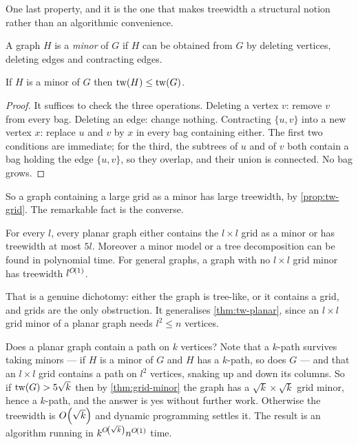 One last property, and it is the one that makes treewidth a structural notion
rather than an algorithmic convenience.

\begin{definition}[Minor]\label{def:minor}
A graph $H$ is a \emph{minor} of $G$ if $H$ can be obtained from $G$ by deleting
vertices, deleting edges and contracting edges.
\end{definition}

\begin{proposition}\label{prop:tw-minor-monotone}
If $H$ is a minor of $G$ then $\mathrm{tw}(H) \le \mathrm{tw}(G)$.
\end{proposition}

\begin{proof}
It suffices to check the three operations. Deleting a vertex $v$: remove $v$
from every bag. Deleting an edge: change nothing. Contracting $\{u,v\}$ into a
new vertex $x$: replace $u$ and $v$ by $x$ in every bag containing either. The
first two conditions are immediate; for the third, the subtrees of $u$ and of
$v$ both contain a bag holding the edge $\{u,v\}$, so they overlap, and their
union is connected. No bag grows.
\end{proof}

So a graph containing a large grid as a minor has large treewidth, by
\cref{prop:tw-grid}. The remarkable fact is the converse.

\begin{theorem}
\label{thm:grid-minor}
For every $l$, every planar graph either contains the $l \times l$ grid as a
minor or has treewidth at most $5l$. Moreover a minor model or a tree
decomposition can be found in polynomial time. For general graphs, a graph with
no $l \times l$ grid minor has treewidth $l^{O\!\left(1\right)}$.
\end{theorem}

That is a genuine dichotomy: either the graph is tree-like, or it contains a
grid, and grids are the only obstruction. It generalises
\cref{thm:tw-planar}, since an $l \times l$ grid minor of a planar graph needs
$l^2 \le n$ vertices.

\begin{example}\label{ex:planar-k-path}
Does a planar graph contain a path on $k$ vertices? Note that a $k$-path
survives taking minors --- if $H$ is a minor of $G$ and $H$ has a $k$-path, so
does $G$ --- and that an $l \times l$ grid contains a path on $l^2$ vertices,
snaking up and down its columns. So if $\mathrm{tw}(G) > 5\sqrt k$ then by
\cref{thm:grid-minor} the graph has a $\sqrt k \times \sqrt k$ grid minor,
hence a $k$-path, and the answer is yes without further work. Otherwise the
treewidth is $O\!\left(\sqrt k\right)$ and dynamic programming settles it. The result is
an algorithm running in $k^{O\!\left(\sqrt k\right)} n^{O\!\left(1\right)}$ time.
\end{example}

